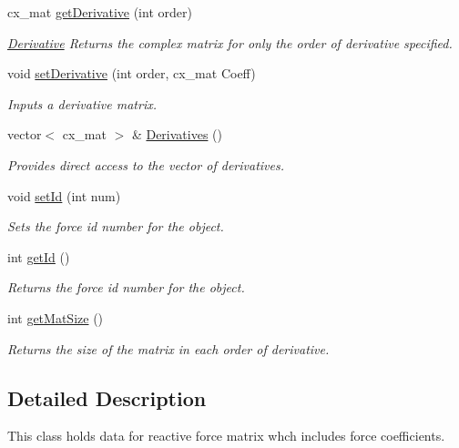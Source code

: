 \begin{DoxyCompactItemize}
cx\-\_\-mat \hyperlink{classmat_react_force_a356968b35d5b97b3b60e161e0b5ab150}{get\-Derivative} (int order)
\begin{DoxyCompactList}\small\item\em \hyperlink{class_derivative}{Derivative} Returns the complex matrix for only the order of derivative specified. \end{DoxyCompactList}\item 
void \hyperlink{classmat_react_force_a3234297ea2fb234b03284e527b50c47c}{set\-Derivative} (int order, cx\-\_\-mat Coeff)
\begin{DoxyCompactList}\small\item\em Inputs a derivative matrix. \end{DoxyCompactList}\item 
vector$<$ cx\-\_\-mat $>$ \& \hyperlink{classmat_react_force_a1a0e65c32c79f08037b0db2573ec4c28}{Derivatives} ()
\begin{DoxyCompactList}\small\item\em Provides direct access to the vector of derivatives. \end{DoxyCompactList}\item 
void \hyperlink{classmat_react_force_aa28cd4435f0c67cd920fcfc912abf211}{set\-Id} (int num)
\begin{DoxyCompactList}\small\item\em Sets the force id number for the object. \end{DoxyCompactList}\item 
int \hyperlink{classmat_react_force_a331b028f5972dfb08631b14fc02d6ca6}{get\-Id} ()
\begin{DoxyCompactList}\small\item\em Returns the force id number for the object. \end{DoxyCompactList}\item 
int \hyperlink{classmat_react_force_a573eb6c3b61ef1501d4ee6281aa2841c}{get\-Mat\-Size} ()
\begin{DoxyCompactList}\small\item\em Returns the size of the matrix in each order of derivative. \end{DoxyCompactList}\end{DoxyCompactItemize}


\subsection{Detailed Description}
This class holds data for reactive force matrix whch includes force coefficients. 

